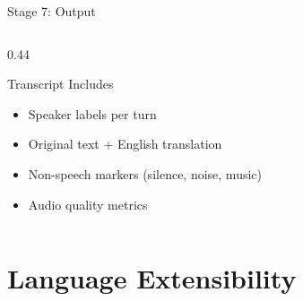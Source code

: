 \documentclass[aspectratio=169, 11pt]{beamer}
\begin{document}
\begin{frame}[fragile]{Stage 7: Output}
\begin{columns}[T]
\begin{column}{0.44\textwidth}
\begin{block}{Transcript Includes}
\begin{itemize}
                    \item Speaker labels per turn
                    \item Original text + English translation
                    \item Non-speech markers (silence, noise, music)
                    \item Audio quality metrics
                \end{itemize}
            \end{block}
        \end{column}
    \end{columns}
\end{frame}

\section{Language Extensibility}
\end{document}
